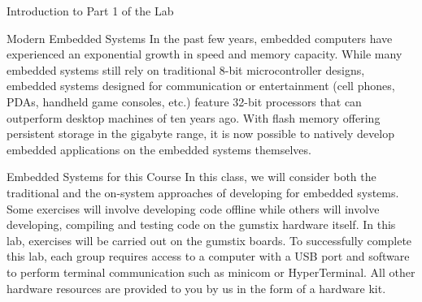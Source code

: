 \documentclass{article}
\begin{document}
\begin{section}{Introduction to Part 1 of the Lab}
		\begin{subsection}{Modern Embedded Systems} 
		In the past few years, embedded
		computers have experienced an exponential growth in
		speed and memory capacity.  While many embedded
		systems still rely on traditional 8-bit
		microcontroller designs, embedded systems designed for
		communication or entertainment (cell phones, PDAs,
		handheld game consoles, etc.) feature 32-bit
		processors that can outperform desktop machines of ten
		years ago.  With flash memory offering persistent
		storage in the gigabyte range, it is now possible to
		natively develop embedded applications on the embedded
		systems themselves.  \end{subsection}

		\begin{subsection}{Embedded Systems for this Course}
			In this class, we will consider both the traditional and the on-system
			approaches of developing for embedded systems.  Some exercises will
			involve developing code offline while others will involve developing,
			compiling and testing code on the gumstix
			hardware itself.  In this lab, exercises will be carried out on the
			gumstix boards.  To successfully complete this lab, each group requires
			access to a computer with a USB port and software to perform terminal
			communication such as minicom or HyperTerminal.  All other hardware
			resources are provided to you by us in the form of a hardware kit.
		\end{subsection}
	\end{section}
\end{document}
